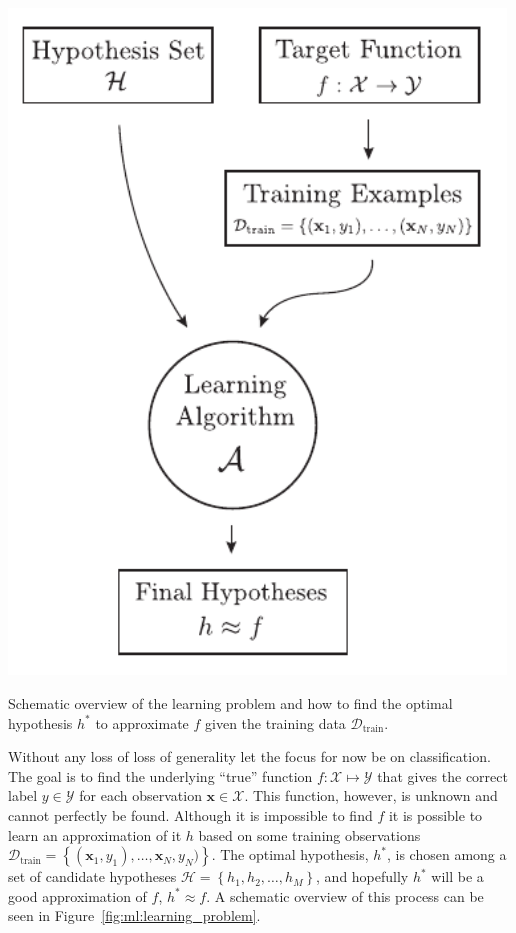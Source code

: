 \documentclass[a4paper, twoside, nobib]{tufte-book}
\newcommand{\q}[1]{``#1''}
\renewcommand{\vec}[1]{\mathbf{#1}}
\begin{document}
\begin{marginfigure}
  \includegraphics[width=0.99\textwidth, trim=5 5 10 5, clip]{figures/learning_problem/learning_problem.pdf}
  \caption[Overview of the learning problem.]
    {Schematic overview of the learning problem and how to find the optimal hypothesis $h^*$ to approximate $f$ given the training data $\mathcal{D}_\mathrm{train}$.
    }
  \label{fig:ml:learning_problem}
\end{marginfigure}

Without any loss of loss of generality let the focus for now be on classification. The goal is to find the underlying \q{true} function $f: \mathcal{X} \mapsto \mathcal{Y}$ that gives the correct label $y\in\mathcal{Y}$ for each observation $\vec{x}\in\mathcal{X}$. This function, however, is unknown and cannot perfectly be found. Although it is impossible to find $f$ it is possible to learn an approximation of it $h$ based on some training observations $\mathcal{D}_\mathrm{train} = \left \{(\vec{x}_1, y_1), \dots, \vec{x}_N, y_N) \right\}$. The optimal hypothesis, $h^*$, is chosen among a set of candidate hypotheses $\mathcal{H} = \left\{h_1, h_2, \ldots, h_M  \right\}$, and hopefully $h^*$ will be a good approximation of $f$, $h^* \approx f$. A schematic overview of this process can be seen in Figure~\ref{fig:ml:learning_problem}. 
\end{document}
